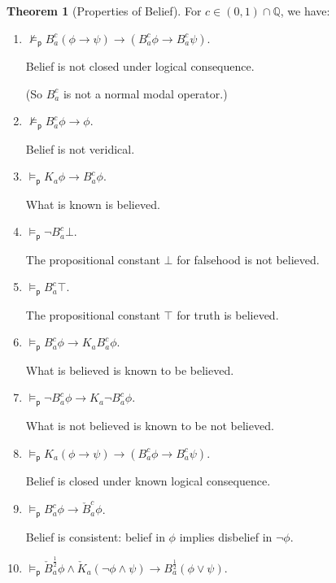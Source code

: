 \documentclass[12pt]{article}
\theoremstyle{definition}
\newtheorem{theorem}{Theorem}[section]
\newcommand{\Rat}{\mathbb{Q}}  %
\newcommand{\modelsp}{\models_{\mathsf{p}}}                  %
\begin{document}
\begin{theorem}[Properties of Belief]
  \label{theorem:belief}
  For $c\in(0,1)\cap\Rat$, we have:
  \begin{enumerate}
  \item \label{item:B-not-normal} $\not\modelsp
    B_a^c(\phi\to\psi)\to(B_a^c\phi\to B_a^c\psi)$.

    Belief is not closed under logical consequence.

    (So $B_a^c$ is not a normal modal operator.)

  \item \label{item:B-not-T} $\not\modelsp B_a^c\phi\to\phi$.

    Belief is not veridical.

  \item \label{item:B-C} $\modelsp K_a\phi\to B_a^c\phi$.

    What is known is believed.

  \item \label{item:B-B} $\modelsp\lnot B^c_a\bot$.

    The propositional constant $\bot$ for falsehood is not believed.

  \item \label{item:B-N} $\modelsp B_a^c\top$.

    The propositional constant $\top$ for truth is believed.

  \item \label{item:B-Ap} $\modelsp B_a^c\phi\to K_aB_a^c\phi$.

    What is believed is known to be believed.

  \item \label{item:B-An} $\modelsp \lnot B_a^c\phi\to K_a\lnot
    B_a^c\phi$.

    What is not believed is known to be not believed.

  \item \label{item:B-M} $\modelsp K_a(\phi\to\psi)\to(B_a^c\phi\to B_a^c\psi)$.

    Belief is closed under known logical consequence.

  \item \label{item:B-D} $\modelsp B_a^c\phi\to \check B_a^c\phi$.

    Belief is consistent: belief in $\phi$ implies
    disbelief in $\lnot\phi$.

  \item \label{item:B-SC} $\modelsp
    \check{B}_a^{\frac 12} \phi \land \check{K}_a(\neg \phi \land \psi)
    \rightarrow B_a^{\frac 12} (\phi \lor \psi)$.
    

\end{enumerate}
\end{theorem}
\end{document}
